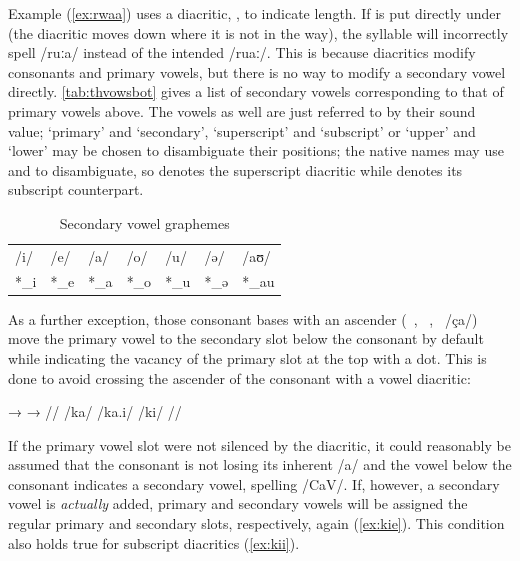 Example (\ref{ex:rwaa}) uses a diacritic, , to indicate length. If 
 is put directly under  (the  diacritic moves
down where it is not in the way), the syllable will incorrectly spell /ruːa/
instead of the intended /ruaː/. This is because diacritics modify consonants
and primary vowels, but there is no way to modify a secondary vowel directly.
\autoref{tab:thvowsbot} gives a list of secondary vowels corresponding to that
of primary vowels above. The vowels as well are just referred to by their sound
value; `primary' and `secondary', `superscript' and `subscript' or `upper' and
`lower' may be chosen to disambiguate their positions; the native names may use
 and  to disambiguate, so  denotes the superscript  diacritic while  denotes its subscript counterpart.

\begin{table}
\caption{Secondary vowel graphemes}

\begin{tabu} to \linewidth{X[c] X[c] X[c] X[c] X[c] X[c] X[c]}
\toprule
\tableheaderfont	/i/ & /e/ & /a/ & /o/ & /u/ & /ə/ & /aʊ/ \\
\rowfont{\Tagati\huge}	*\_i & *\_e & *\_a & *\_o & *\_u & *\_ə & *\_au \\

\bottomrule
\end{tabu}
\label{tab:thvowsbot}
\end{table}

As a further exception, those consonant bases with an ascender 
(~, ~, ~/ça/) move the primary vowel to 
the secondary slot below the consonant by default while indicating the vacancy 
of the primary slot at the top with a dot. This is done to avoid crossing the 
ascender of the consonant with a vowel diacritic:

\ex[lingstyle=thex]\begingl
	\gla {}	→		→	 //
	\glb /ka/	{}	/ka.i/		{}	/ki/ //
\endgl\xe

If the primary vowel slot were not silenced by the  diacritic, it 
could reasonably be assumed that the consonant is not losing its inherent /a/ 
and the vowel below the consonant indicates a secondary vowel, spelling /CaV/. 
If, however, a secondary vowel is \emph{actually} added, primary and secondary 
vowels will be assigned the regular primary and secondary slots, respectively, 
again (\ref{ex:kie}). This condition also holds true for subscript diacritics 
(\ref{ex:kii}).

